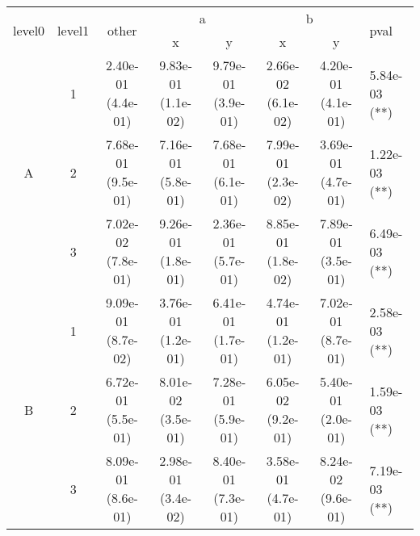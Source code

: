 \begin{tabular}{cccccccl}
\toprule
\multirow{2}{*}{level0} & \multirow{2}{*}{level1}& \multirow{2}{*}{other}&\multicolumn{2}{c}{a}&\multicolumn{2}{c}{b}& \multirow{2}{*}{pval}\tabularnewline
\cmidrule(lr){4-5}
\cmidrule(lr){6-7}
&&&x&y&x&y\tabularnewline
\midrule
\multirow{3}{*}{A}&1& 2.40e-01 (4.4e-01)& 9.83e-01 (1.1e-02)& 9.79e-01 (3.9e-01)& 2.66e-02 (6.1e-02)& 4.20e-01 (4.1e-01)& 5.84e-03 (**)\tabularnewline
&2& 7.68e-01 (9.5e-01)& 7.16e-01 (5.8e-01)& 7.68e-01 (6.1e-01)& 7.99e-01 (2.3e-02)& 3.69e-01 (4.7e-01)& 1.22e-03 (**)\tabularnewline
&3& 7.02e-02 (7.8e-01)& 9.26e-01 (1.8e-01)& 2.36e-01 (5.7e-01)& 8.85e-01 (1.8e-02)& 7.89e-01 (3.5e-01)& 6.49e-03 (**)\tabularnewline
\midrule
\multirow{3}{*}{B}&1& 9.09e-01 (8.7e-02)& 3.76e-01 (1.2e-01)& 6.41e-01 (1.7e-01)& 4.74e-01 (1.2e-01)& 7.02e-01 (8.7e-01)& 2.58e-03 (**)\tabularnewline
&2& 6.72e-01 (5.5e-01)& 8.01e-02 (3.5e-01)& 7.28e-01 (5.9e-01)& 6.05e-02 (9.2e-01)& 5.40e-01 (2.0e-01)& 1.59e-03 (**)\tabularnewline
&3& 8.09e-01 (8.6e-01)& 2.98e-01 (3.4e-02)& 8.40e-01 (7.3e-01)& 3.58e-01 (4.7e-01)& 8.24e-02 (9.6e-01)& 7.19e-03 (**)\tabularnewline
\bottomrule
\end{tabular}
